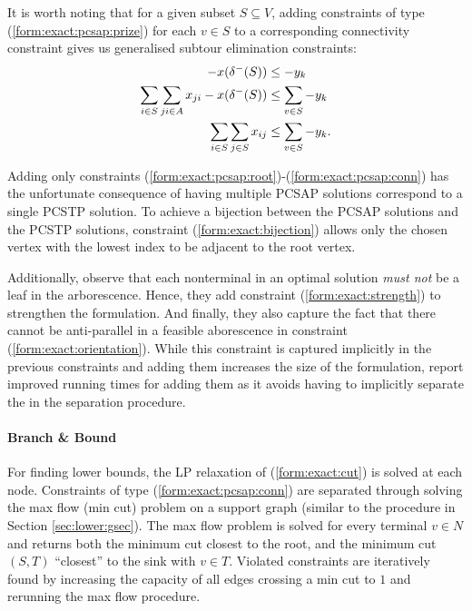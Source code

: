  It is worth noting that for a given subset $S \subseteq V$, adding constraints of type
 (\ref{form:exact:pcsap:prize}) for each $v \in S$ to a corresponding connectivity constraint
  gives us generalised subtour elimination constraints:
 \begin{align*}
   -x(\delta^-(S)) &\leq -y_k \\
   \sum_{i \in S} \sum_{ji \in A} x_{ji} - x (\delta^-(S)) &\leq \sum_{v \in S} - y_k \\
   \sum_{i \in S} \sum_{j \in S} x_{ij} &\leq \sum_{v \in S} - y_k \mathnormal{.}
 \end{align*}

 Adding only constraints (\ref{form:exact:pcsap:root})-(\ref{form:exact:pcsap:conn})
 has the unfortunate consequence of having multiple 
 PCSAP solutions
 correspond
 to a single PCSTP solution. To achieve a bijection between the PCSAP solutions and the
 PCSTP solutions, constraint (\ref{form:exact:bijection}) allows only the chosen vertex
 with the lowest index to be adjacent to the root vertex.
 
 Additionally, \citet{ljubic2005solving} observe that each nonterminal in an optimal solution
 \textit{must not} be a leaf in the arborescence. Hence, they add constraint
 (\ref{form:exact:strength}) to strengthen the formulation. And finally, they
 also capture the fact that there cannot be anti-parallel in a feasible aborescence in
 constraint (\ref{form:exact:orientation}). While this constraint is captured implicitly
 in the previous constraints and adding them increases the size of the formulation,
 \citet{ljubic2005solving} report improved running times for adding them as it avoids
 having to implicitly separate the in the separation procedure.
 
\paragraph{Branch \& Bound}

For finding lower bounds, the LP relaxation of (\ref{form:exact:cut}) is solved at each node.
Constraints of type (\ref{form:exact:pcsap:conn}) are separated through solving the max flow (min cut)
problem on a support graph (similar to the procedure in Section \ref{sec:lower:gsec}). 
The max flow problem is solved for every terminal $v \in N$ and returns both the minimum cut closest to
the root, and the minimum cut $(S,T)$ ``closest'' to the sink with $v \in T$.
Violated constraints are iteratively found by increasing the
capacity of all edges crossing a min cut to $1$ and rerunning the max flow procedure.


